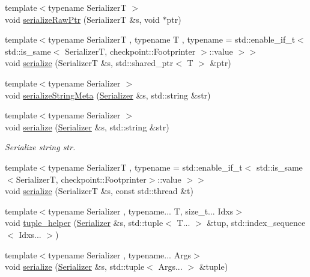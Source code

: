 \begin{DoxyCompactItemize}
\item 
{\footnotesize template$<$typename SerializerT $>$ }\\void \hyperlink{namespacecheckpoint_aaadeb0ab61d069afc8a97ec6b6dc630c}{serialize\+Raw\+Ptr} (SerializerT \&s, void $\ast$ptr)
\item 
{\footnotesize template$<$typename SerializerT , typename T , typename  = std\+::enable\+\_\+if\+\_\+t$<$    std\+::is\+\_\+same$<$      Serializer\+T,      checkpoint\+::\+Footprinter    $>$\+::value  $>$$>$ }\\void \hyperlink{namespacecheckpoint_aff1bebba5ce7fda79f83d2af8c859254}{serialize} (SerializerT \&s, std\+::shared\+\_\+ptr$<$ T $>$ \&ptr)
\item 
{\footnotesize template$<$typename Serializer $>$ }\\void \hyperlink{namespacecheckpoint_a1ea8e1ef9d0a10d26df77cb5309435aa}{serialize\+String\+Meta} (\hyperlink{structcheckpoint_1_1_serializer}{Serializer} \&s, std\+::string \&str)
\item 
{\footnotesize template$<$typename Serializer $>$ }\\void \hyperlink{namespacecheckpoint_aef8e8717e4cc129379525653730c4eba}{serialize} (\hyperlink{structcheckpoint_1_1_serializer}{Serializer} \&s, std\+::string \&str)
\begin{DoxyCompactList}\small\item\em Serialize string {\ttfamily str}. \end{DoxyCompactList}\item 
{\footnotesize template$<$typename SerializerT , typename  = std\+::enable\+\_\+if\+\_\+t$<$    std\+::is\+\_\+same$<$\+Serializer\+T, checkpoint\+::\+Footprinter$>$\+::value  $>$$>$ }\\void \hyperlink{namespacecheckpoint_ab9c05efe18a47d990fb20e84f73e9943}{serialize} (SerializerT \&s, const std\+::thread \&t)
\item 
{\footnotesize template$<$typename Serializer , typename... T, size\+\_\+t... Idxs$>$ }\\void \hyperlink{namespacecheckpoint_ab763d3ca9396ff9a1896f5da6c2b3c54}{tuple\+\_\+helper} (\hyperlink{structcheckpoint_1_1_serializer}{Serializer} \&s, std\+::tuple$<$ T... $>$ \&tup, std\+::index\+\_\+sequence$<$ Idxs... $>$)
\item 
{\footnotesize template$<$typename Serializer , typename... Args$>$ }\\void \hyperlink{namespacecheckpoint_a7ac21fa6ad08fd64a47c789c32966019}{serialize} (\hyperlink{structcheckpoint_1_1_serializer}{Serializer} \&s, std\+::tuple$<$ Args... $>$ \&tuple)

\end{DoxyCompactItemize}
